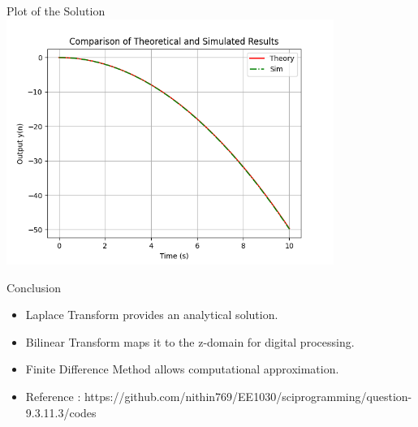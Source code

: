 \documentclass{beamer}
\begin{document}
\begin{frame}{Plot of the Solution}
	\centering
	\includegraphics[width=0.8\textwidth]{figs/fig.png}
\end{frame}

\begin{frame}{Conclusion}
	\begin{itemize}
		\item Laplace Transform provides an analytical solution.
		\item Bilinear Transform maps it to the z-domain for digital processing.
		\item Finite Difference Method allows computational approximation.
		\item \footnotesize Reference : https://github.com/nithin769/EE1030/sciprogramming/question-9.3.11.3/codes
	\end{itemize}
\end{frame}
\end{document}
